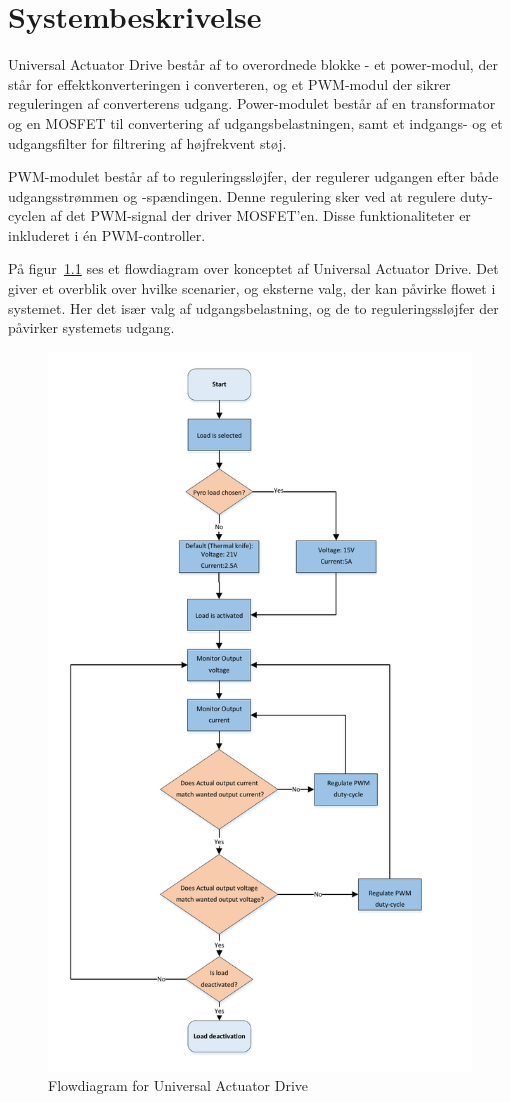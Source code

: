 
\chapter{Systembeskrivelse}
Universal Actuator Drive består af to overordnede blokke - et power-modul, der står for effektkonverteringen i converteren, og et PWM-modul der sikrer reguleringen af converterens udgang. Power-modulet består af en transformator og en MOSFET til convertering af udgangsbelastningen, samt et indgangs- og et udgangsfilter for filtrering af højfrekvent støj.

PWM-modulet består af to reguleringssløjfer, der regulerer udgangen efter både udgangsstrømmen og -spændingen. Denne regulering sker ved at regulere duty-cyclen af det PWM-signal der driver MOSFET'en. Disse funktionaliteter er inkluderet i én PWM-controller. 

På figur~\ref{fig:flowdiagram} ses et flowdiagram over konceptet af Universal Actuator Drive. Det giver et overblik over hvilke scenarier, og eksterne valg, der kan påvirke flowet i systemet. Her det især valg af udgangsbelastning, og de to reguleringssløjfer der påvirker systemets udgang. 

\begin{figure}[H]
	\centering
	\includegraphics[width=0.7\linewidth]{../Dokumentation/tex/kravspecifikation/billeder/Flow_diagram.pdf}
	\caption{Flowdiagram for Universal Actuator Drive}
	\label{fig:flowdiagram}
\end{figure}